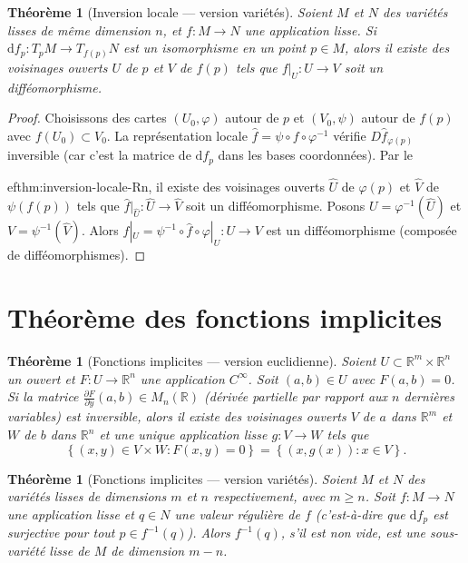 \documentclass[12pt,a4paper,openany]{book}
\theoremstyle{definition}
\theoremstyle{plain}
\newtheorem{theoreme}[definition]{Théorème}
\theoremstyle{remark}
\newcommand{\R}{\mathbb{R}}
\newcommand{\dd}{\mathrm{d}}
\newcommand{\set}[1]{\left\{#1\right\}}
\begin{document}
\begin{theoreme}[Inversion locale --- version variétés]\label{thm:inversion-locale}
Soient $M$ et $N$ des variétés lisses de même dimension $n$, et $f \colon M \to
N$ une application lisse. Si $\dd f_p \colon T_pM \to T_{f(p)}N$ est un
isomorphisme en un point $p \in M$, alors il existe des voisinages ouverts $U$
de $p$ et $V$ de $f(p)$ tels que $f|_U \colon U \to V$ soit un difféomorphisme.
\end{theoreme}

\begin{proof}
Choisissons des cartes $(U_0, \varphi)$ autour de $p$ et $(V_0, \psi)$ autour
de $f(p)$ avec $f(U_0) \subset V_0$. La représentation locale $\hat{f} =
\psi \circ f \circ \varphi^{-1}$ vérifie $D\hat{f}_{\varphi(p)}$ inversible
(car c'est la matrice de $\dd f_p$ dans les bases coordonnées). Par le

ef{thm:inversion-locale-Rn}, il existe des voisinages ouverts $\hat{U}$ de
$\varphi(p)$ et $\hat{V}$ de $\psi(f(p))$ tels que $\hat{f}|_{\hat{U}} \colon
\hat{U} \to \hat{V}$ soit un difféomorphisme. Posons $U = \varphi^{-1}(\hat{U})$
et $V = \psi^{-1}(\hat{V})$. Alors $f|_U = \psi^{-1} \circ \hat{f} \circ
\varphi|_U \colon U \to V$ est un difféomorphisme (composée de
difféomorphismes).
\end{proof}


\section{Théorème des fonctions implicites}
\label{sec:fonctions-implicites}

\begin{theoreme}[Fonctions implicites --- version euclidienne]\label{thm:fonctions-implicites-Rn}
Soient $U \subset \R^m \times \R^n$ un ouvert et $F \colon U \to \R^n$ une
application $C^\infty$. Soit $(a, b) \in U$ avec $F(a, b) = 0$. Si la matrice
$\frac{\partial F}{\partial y}(a, b) \in M_n(\R)$ (dérivée partielle par rapport
aux $n$ dernières variables) est inversible, alors il existe des voisinages
ouverts $V$ de $a$ dans $\R^m$ et $W$ de $b$ dans $\R^n$ et une unique
application lisse $g \colon V \to W$ tels que
\[
    \set{(x, y) \in V \times W : F(x, y) = 0} = \set{(x, g(x)) : x \in V}.
\]
\end{theoreme}

\begin{theoreme}[Fonctions implicites --- version variétés]\label{thm:fonctions-implicites}
Soient $M$ et $N$ des variétés lisses de dimensions $m$ et $n$ respectivement,
avec $m \geq n$. Soit $f \colon M \to N$ une application lisse et $q \in N$
une \emph{valeur régulière} de $f$ (c'est-à-dire que
$\dd f_p$ est surjective pour tout $p \in f^{-1}(q)$). Alors $f^{-1}(q)$, s'il
est non vide, est une sous-variété lisse de $M$ de dimension $m - n$.
\end{theoreme}
\end{document}
